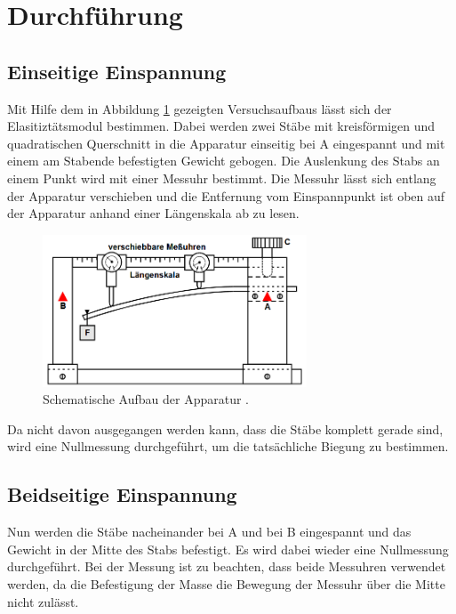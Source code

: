 \section{Durchführung}
\label{sec:Durchfuehrung}

\subsection{Einseitige Einspannung}
\label{sec:einseiteEinspannung}
Mit Hilfe dem in Abbildung \ref{fig:aufbau} gezeigten Versuchsaufbaus lässt sich der Elasitiztätsmodul bestimmen.
Dabei werden zwei Stäbe mit kreisförmigen und quadratischen Querschnitt in die Apparatur einseitig bei A eingespannt 
und mit einem am Stabende befestigten Gewicht gebogen.
Die Auslenkung des Stabs an einem Punkt wird mit einer Messuhr bestimmt. Die Messuhr lässt sich entlang der Apparatur
verschieben und die Entfernung vom Einspannpunkt ist oben auf der Apparatur anhand einer Längenskala ab zu lesen.

\begin{figure}
    \centering
    \includegraphics[width=0.7\textwidth]{aufbau.png}
    \caption{Schematische Aufbau der Apparatur \cite{anleitung}.}
    \label{fig:aufbau}
\end{figure}

Da nicht davon ausgegangen werden kann, dass die Stäbe komplett gerade sind, wird eine Nullmessung durchgeführt, um
die tatsächliche Biegung zu bestimmen.

\subsection{Beidseitige Einspannung}
\label{sec:beidseitigeEinspannung}
Nun werden die Stäbe nacheinander bei A und bei B eingespannt und das Gewicht in der Mitte des Stabs befestigt. Es wird dabei
wieder eine Nullmessung durchgeführt. Bei der Messung ist zu beachten, dass beide Messuhren verwendet werden, da die Befestigung
der Masse die Bewegung der Messuhr über die Mitte nicht zulässt.